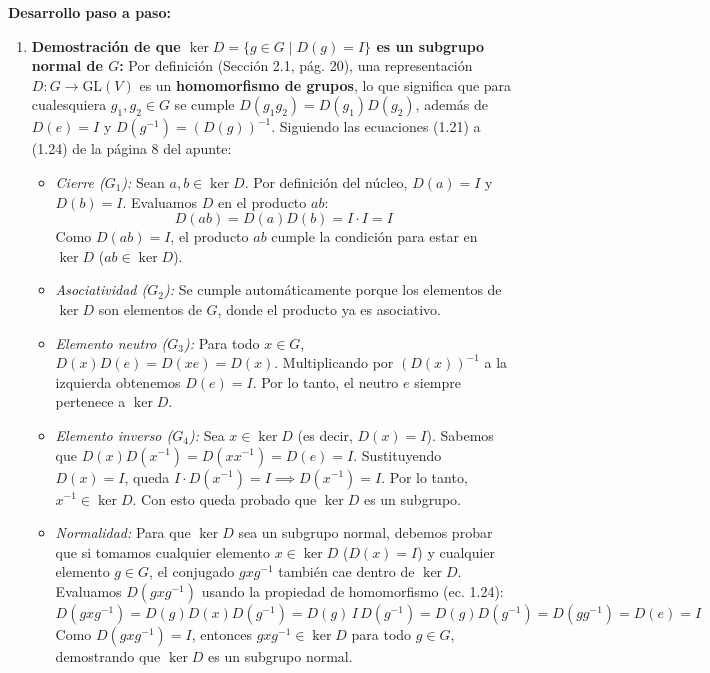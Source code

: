 \documentclass[11pt, a4paper]{article}
\begin{document}
\textbf{Desarrollo paso a paso:}
\begin{enumerate}
    \item \textbf{Demostración de que $\ker D = \{g \in G \mid D(g) = I\}$ es un subgrupo normal de $G$:}
    Por definición (Sección 2.1, pág. 20), una representación $D : G \to \text{GL}(V)$ es un \textbf{homomorfismo de grupos}, lo que significa que para cualesquiera $g_1, g_2 \in G$ se cumple $D(g_1 g_2) = D(g_1) D(g_2)$, además de $D(e) = I$ y $D(g^{-1}) = (D(g))^{-1}$. Siguiendo las ecuaciones (1.21) a (1.24) de la página 8 del apunte:
    \begin{itemize}
        \item \textit{Cierre ($G_1$):} Sean $a, b \in \ker D$. Por definición del núcleo, $D(a) = I$ y $D(b) = I$. Evaluamos $D$ en el producto $ab$:
        \[
        D(ab) = D(a) D(b) = I \cdot I = I
        \]
        Como $D(ab) = I$, el producto $ab$ cumple la condición para estar en $\ker D$ ($ab \in \ker D$).
        \item \textit{Asociatividad ($G_2$):} Se cumple automáticamente porque los elementos de $\ker D$ son elementos de $G$, donde el producto ya es asociativo.
        \item \textit{Elemento neutro ($G_3$):} Para todo $x \in G$, $D(x) D(e) = D(xe) = D(x)$. Multiplicando por $(D(x))^{-1}$ a la izquierda obtenemos $D(e) = I$. Por lo tanto, el neutro $e$ siempre pertenece a $\ker D$.
        \item \textit{Elemento inverso ($G_4$):} Sea $x \in \ker D$ (es decir, $D(x) = I$). Sabemos que $D(x) D(x^{-1}) = D(xx^{-1}) = D(e) = I$. Sustituyendo $D(x) = I$, queda $I \cdot D(x^{-1}) = I \implies D(x^{-1}) = I$. Por lo tanto, $x^{-1} \in \ker D$. Con esto queda probado que $\ker D$ es un subgrupo.
        \item \textit{Normalidad:} Para que $\ker D$ sea un subgrupo normal, debemos probar que si tomamos cualquier elemento $x \in \ker D$ ($D(x) = I$) y cualquier elemento $g \in G$, el conjugado $gxg^{-1}$ también cae dentro de $\ker D$. Evaluamos $D(gxg^{-1})$ usando la propiedad de homomorfismo (ec. 1.24):
        \[
        D(gxg^{-1}) = D(g) D(x) D(g^{-1}) = D(g) \, I \, D(g^{-1}) = D(g) D(g^{-1}) = D(gg^{-1}) = D(e) = I
        \]
        Como $D(gxg^{-1}) = I$, entonces $gxg^{-1} \in \ker D$ para todo $g \in G$, demostrando que $\ker D$ es un subgrupo normal.
    \end{itemize}


\end{enumerate}
\end{document}
